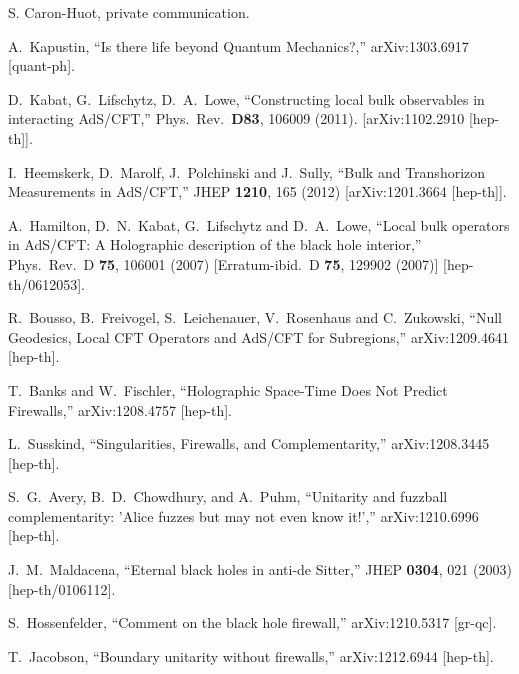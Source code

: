 \documentclass[12pt]{article}
\begin{document}
{\begin{thebibliography}{99}
 S. Caron-Huot, private communication.

  A.~Kapustin,
  ``Is there life beyond Quantum Mechanics?,''
  arXiv:1303.6917 [quant-ph].

  D.~Kabat, G.~Lifschytz, D.~A.~Lowe,
  ``Constructing local bulk observables in interacting AdS/CFT,''
  Phys.\ Rev.\  {\bf D83}, 106009 (2011).
  [arXiv:1102.2910 [hep-th]].

  I.~Heemskerk, D.~Marolf, J.~Polchinski and J.~Sully,
  ``Bulk and Transhorizon Measurements in AdS/CFT,''
  JHEP {\bf 1210}, 165 (2012)
  [arXiv:1201.3664 [hep-th]].

  A.~Hamilton, D.~N.~Kabat, G.~Lifschytz and D.~A.~Lowe,
  ``Local bulk operators in AdS/CFT: A Holographic description of the black hole interior,''
  Phys.\ Rev.\ D {\bf 75}, 106001 (2007)
  [Erratum-ibid.\ D {\bf 75}, 129902 (2007)]
  [hep-th/0612053].

  R.~Bousso, B.~Freivogel, S.~Leichenauer, V.~Rosenhaus and C.~Zukowski,
  ``Null Geodesics, Local CFT Operators and AdS/CFT for Subregions,''
  arXiv:1209.4641 [hep-th].

  T.~Banks and W.~Fischler,
  ``Holographic Space-Time Does Not Predict Firewalls,''
  arXiv:1208.4757 [hep-th].

  L.~Susskind,
  ``Singularities, Firewalls, and Complementarity,''
  arXiv:1208.3445 [hep-th].

  S.~G.~Avery, B.~D.~Chowdhury, and A.~Puhm,
  ``Unitarity and fuzzball complementarity: 'Alice fuzzes but may not even know it!',''
  arXiv:1210.6996 [hep-th].

  J.~M.~Maldacena,
  ``Eternal black holes in anti-de Sitter,''
  JHEP {\bf 0304}, 021 (2003)
  [hep-th/0106112].

  S.~Hossenfelder,
  ``Comment on the black hole firewall,''
  arXiv:1210.5317 [gr-qc].

  T.~Jacobson,
  ``Boundary unitarity without firewalls,''
  arXiv:1212.6944 [hep-th].


\end{thebibliography}}
\end{document}
